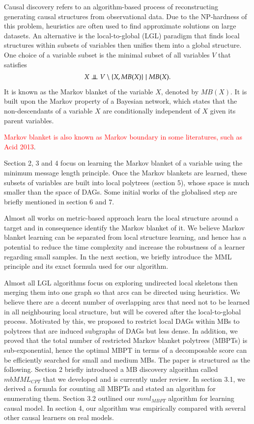 Causal discovery refers to an algorithm-based process of reconstructing generating causal structures from observational data. Due to the NP-hardness of this problem\cite{chickering1995learning}, heuristics are often used to find approximate solutions on large datasets. An alternative is the local-to-global (LGL) paradigm that finds local structures within subsets of variables then unifies them into a global structure. One choice of a variable subset is the minimal subset of all variables $V$ that satisfies  
\begin{align*}
X \ci V \setminus \{X, MB(X)\} \mid MB(X).
\end{align*}
It is known as the Markov blanket \cite{pearl1988probabilistic}of the variable $X$, denoted by $MB(X)$. It is built upon the Markov property of a Bayesian network, which states that the non-descendants of a variable $X$ are conditionally independent of $X$ given its parent variables. 

\textcolor{red}{Markov blanket is also known as Markov boundary in some literatures, such as Acid 2013}. 

Section 2, 3 and 4 focus on learning the Markov blanket of a variable using the minimum message length principle. Once the Markov blankets are learned, these subsets of variables are built into local polytrees (section 5), whose space is much smaller than the space of DAGs. Some initial works of the globalised step are briefly mentioned in section 6 and 7.  

Almost all works on metric-based approach learn the local structure around a target and in consequence identify the Markov blanket of it. We believe Markov blanket learning can be separated from local structure learning, and hence has a potential to reduce the time complexity and increase the robustness of a learner regarding small samples. In the next section, we briefly introduce the MML principle and its exact formula used for our \mmlcpt algorithm.

Almost all LGL algorithms focus on exploring undirected local skeletons then merging them into one graph so that arcs can be directed using heuristics. We believe there are a decent number of overlapping arcs that need not to be learned in all neighbouring local structure, but will be covered after the local-to-global process. Motivated by this, we proposed to restrict local DAGs within MBs to polytrees that are induced subgraphs of DAGs but less dense. In addition, we proved that the total number of restricted Markov blanket polytrees (MBPTs) is sub-exponential, hence the optimal MBPT in terms of a decomposable score can be efficiently searched for small and medium MBs. The paper is structured as the following. Section 2 briefly introduced a MB discovery algorithm called $mbMML_{CPT}$ that we developed and is currently under review.  In section 3.1, we derived a formula for counting all MBPTs and stated an algorithm for enumerating them. Section 3.2 outlined our $mml_{MBPT}$ algorithm for learning causal model. In section 4, our algorithm was empirically compared with several other causal learners on real models.  

